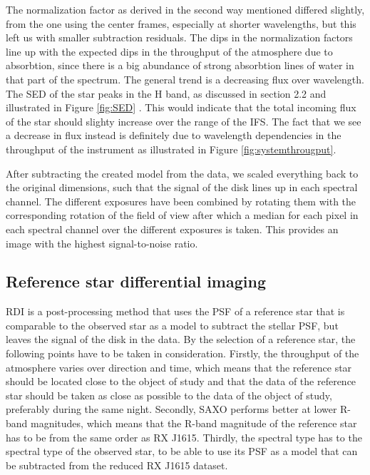 \documentclass[twoside,single]{lion-msc}
\begin{document}
The normalization factor as derived in the second way mentioned differed slightly, from the one using the center frames, especially at shorter wavelengths, but this left us with smaller subtraction residuals. The dips in the normalization factors line up with the expected dips in the throughput of the atmosphere due to absorbtion, since there is a big abundance of strong absorbtion lines of water in that part of the spectrum. The general trend is a decreasing flux over wavelength. The SED of the star peaks in the H band, as discussed in section 2.2 and illustrated in Figure \ref{fig:SED} \citep{Padgett2008}. This would indicate that the total incoming flux of the star should slighty increase over the range of the IFS. The fact that we see a decrease in flux instead is definitely due to wavelength dependencies in the throughput of the instrument as illustrated in Figure \ref{fig:systemthrougput}.
\bigskip

After subtracting the created model from the data, we scaled everything back to the original dimensions, such that the signal of the disk lines up in each spectral channel. The different exposures have been combined by rotating them with the corresponding rotation of the field of view after which a median for each pixel in each spectral channel over the different exposures is taken. This provides an image with the highest signal-to-noise ratio.

\subsection{Reference star differential imaging}
RDI is a post-processing method that uses the PSF of a reference star that is comparable to the observed star as a model to subtract the stellar PSF, but leaves the signal of the disk in the data. By the selection of a reference star, the following points have to be taken in consideration. Firstly, the throughput of the atmosphere varies over direction and time, which means that the reference star should be located close to the object of study and that the data of the reference star should be taken as close as possible to the data of the object of study, preferably during the same night. Secondly, SAXO performs better at lower R-band magnitudes, which means that the R-band magnitude of the reference star has to be from the same order as RX J1615. Thirdly, the spectral type has to the spectral type of the observed star, to be able to use its PSF as a model that can be subtracted from the reduced RX J1615 dataset. 
\bigskip
\end{document}
